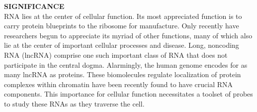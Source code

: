 

\textbf{SIGNIFICANCE}\\
RNA lies at the center of cellular function. Its most appreciated function is to carry protein blueprints to the ribosome for manufacture. Only recently have researchers begun to appreciate its myriad of other functions, many of which also lie at the center of important cellular processes and disease\cite{CechNoncodingRNARevolution2014,DellaRagioneNoncodingRNAschromatin2014}.
Long, noncoding RNA (lncRNA) comprise one such important class of RNA that does not participate in the central dogma\cite{RinnGenomeRegulationLong2012}. Alarmingly, the human genome encodes for as many lncRNA as proteins\cite{Rinntranscriptionalactivityhuman2003}.
These biomolecules regulate localization of protein complexes within chromatin
 have been recently found to have crucial RNA components.
This importance for cellular function necessitates a toolset of probes to study these RNAs as they traverse the cell.


